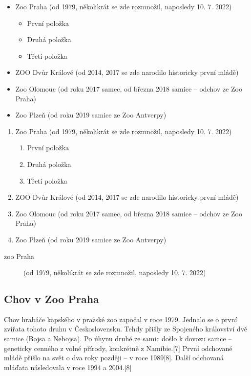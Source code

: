 \documentclass[a4paper, 12pt]{article}
\begin{document}
\begin{itemize}
 
    \item Zoo Praha (od 1979, několikrát se zde rozmnožil, naposledy 10. 7. 2022)
    \begin{itemize}
        \item První položka
        \item Druhá položka
        \item Třetí položka
    \end{itemize}
    \item ZOO Dvůr Králové (od 2014, 2017 se zde narodilo historicky první mládě)
    \item Zoo Olomouc (od roku 2017 samec, od března 2018 samice – odchov ze Zoo Praha)
    \item Zoo Plzeň (od roku 2019 samice ze Zoo Antverpy)
    
\end{itemize}

\begin{enumerate}
 
    \item Zoo Praha (od 1979, několikrát se zde rozmnožil, naposledy 10. 7. 2022)
    \begin{enumerate}
        \item První položka
        \item Druhá položka
        \item Třetí položka 
    \end{enumerate}
    \item ZOO Dvůr Králové (od 2014, 2017 se zde narodilo historicky první mládě)
    \item Zoo Olomouc (od roku 2017 samec, od března 2018 samice – odchov ze Zoo Praha)
    \item Zoo Plzeň (od roku 2019 samice ze Zoo Antverpy)
    
\end{enumerate}

\begin{description}
    \item[zoo Praha] (od 1979, několikrát se zde rozmnožil, naposledy 10. 7. 2022)
\end{description}

\subsection[Praha]{Chov v Zoo Praha}

Chov hrabáče kapského v pražské zoo započal v roce 1979. Jednalo se o první zvířata tohoto druhu v Československu. Tehdy přišly ze Spojeného království dvě samice (Bojsa a Nebojsa). Po úhynu druhé ze samic došlo k dovozu samce – geneticky cenného z volné přírody, konkrétně z Namibie.[7] První odchované mládě přišlo na svět o dva roky později – v roce 1989[8]. Další odchovaná mláďata následovala v roce 1994 a 2004.[8]
\end{document}
